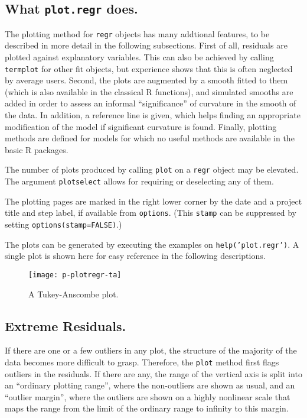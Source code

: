 \documentclass{article}
\providecommand{\T}{\texttt}
\begin{document}
\subsection{What \T{plot.regr} does.}
The plotting method for \T{regr} objects has many addtional features, to be
described in more detail in the following subsections.
First of all, residuals are plotted against explanatory variables.
This can also be achieved by calling \T{termplot} for other fit objects,  
but experience shows that this is often neglected by average users.
Second, the plots are augmented by a smooth fitted to them (which is also
available in the classical R functions), and simulated smooths are added in
order to assess an informal ``significance'' of curvature in the smooth of
the data. In addition, a reference line is given, which helps finding
an appropriate modification of the model if significant curvature is
found. 
Finally, plotting methods are defined for models for which no useful 
methods are available in the basic R packages.

The number of plots produced by calling \T{plot} on a \T{regr} object may
be elevated. The argument \T{plotselect} allows for requiring or deselecting
any of them. 

The plotting pages are marked in the right lower corner by the date and a
project title and step label, if available from \T{options}. 
(This \T{stamp} can be suppressed by setting \T{options(stamp=FALSE)}.) 

The plots can be generated by executing the examples on
\T{help('plot.regr')}. 
A single plot is shown here for easy reference in the following
descriptions. 

\begin{figure}[htb]
\centerline{\texttt{[image: p-plotregr-ta]}}
\caption{A Tukey-Anscombe plot.}
\end{figure}

\subsection{Extreme Residuals.}
If there are one or a few outliers in any plot, the structure of the
majority of the data becomes more difficult to grasp. 
Therefore, the \T{plot} method first flags outliers in the residuals.
If there are any, the range of the vertical axis is split into an
``ordinary plotting range'', where the non-outliers are shown as usual, and
an ``outlier margin'', where the outliers are shown on a highly nonlinear
scale that maps the range from the limit of the ordinary range to infinity 
to this margin.
\end{document}
